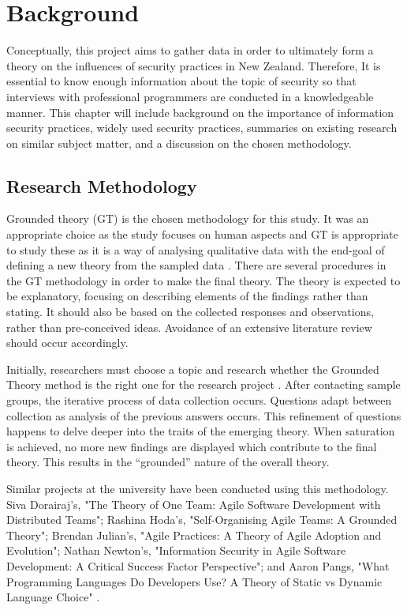 \chapter{Background}\label{C:Background}

\par Conceptually, this project aims to gather data in order to ultimately form a theory on the influences of security practices in New Zealand. Therefore, It is essential to know enough information about the topic of security so that interviews with professional programmers are conducted in a knowledgeable manner. This chapter will include background on the importance of information security practices, widely used security practices, summaries on existing research on similar subject matter, and a discussion on the chosen methodology.  

\section{Research Methodology}

Grounded theory (GT) is the chosen methodology for this study. It was an appropriate choice as the study focuses on human aspects and GT is appropriate to study these as it is a way of analysing qualitative data with the end-goal of defining a new theory from the sampled data \cite{geeks}. There are several procedures in the GT  methodology in order to make the final theory.  The theory is expected to be explanatory, focusing on describing elements of the findings rather than stating. It should also be based on the collected responses and observations, rather than pre-conceived ideas. Avoidance of an extensive literature review should occur accordingly.
\newline
\par Initially, researchers must choose a topic and research whether the Grounded Theory method is the right one for the research project \cite{geeks}. After contacting sample groups, the iterative process of data collection occurs. Questions adapt between collection as analysis of the previous answers occurs. This refinement of questions happens to delve deeper into the traits of the emerging theory. When saturation is achieved, no more new findings are displayed which contribute to the final theory. This results in the “grounded” nature of the overall theory.
\newline
\par Similar projects at the university have been conducted using this methodology. Siva Dorairaj's, "The Theory of One Team: Agile Software Development with Distributed Teams"; Rashina Hoda's, "Self-Organising Agile Teams: A Grounded Theory"; Brendan Julian's, "Agile Practices: A Theory of Agile Adoption and Evolution"; Nathan Newton's, "Information Security in Agile Software Development: A Critical Success Factor Perspective"; and Aaron Pangs, "What Programming Languages Do Developers Use? A Theory of Static vs Dynamic Language Choice" \cite{alumni}.

